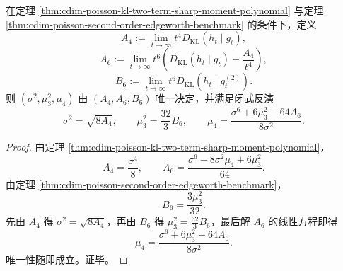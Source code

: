 \begin{theorem}\label{thm:cdim-poisson-entropy-moment-tomography-up-to-fourth}
在定理 \ref{thm:cdim-poisson-kl-two-term-sharp-moment-polynomial} 与定理 \ref{thm:cdim-poisson-second-order-edgeworth-benchmark} 的条件下，定义
\[
A_4:=\lim_{t\to\infty}t^4D_{\mathrm{KL}}(h_t\mid g_t),
\]
\[
A_6:=\lim_{t\to\infty}t^6\!\left(D_{\mathrm{KL}}(h_t\mid g_t)-\frac{A_4}{t^4}\right),
\]
\[
B_6:=\lim_{t\to\infty}t^6D_{\mathrm{KL}}(h_t\mid g_t^{(2)}).
\]
则 \((\sigma^2,\mu_3^2,\mu_4)\) 由 \((A_4,A_6,B_6)\) 唯一决定，并满足闭式反演
\[
\sigma^2=\sqrt{8A_4},
\qquad
\mu_3^2=\frac{32}{3}B_6,
\qquad
\mu_4=\frac{\sigma^6+6\mu_3^2-64A_6}{8\sigma^2}.
\]
\end{theorem}
\begin{proof}
由定理 \ref{thm:cdim-poisson-kl-two-term-sharp-moment-polynomial}，
\[
A_4=\frac{\sigma^4}{8},
\qquad
A_6=\frac{\sigma^6-8\sigma^2\mu_4+6\mu_3^2}{64}.
\]
由定理 \ref{thm:cdim-poisson-second-order-edgeworth-benchmark}，
\[
B_6=\frac{3\mu_3^2}{32}.
\]
先由 \(A_4\) 得 \(\sigma^2=\sqrt{8A_4}\)，再由 \(B_6\) 得 \(\mu_3^2=\frac{32}{3}B_6\)，最后解 \(A_6\) 的线性方程即得
\[
\mu_4=\frac{\sigma^6+6\mu_3^2-64A_6}{8\sigma^2}.
\]
唯一性随即成立。证毕。
\end{proof}


\endinput
